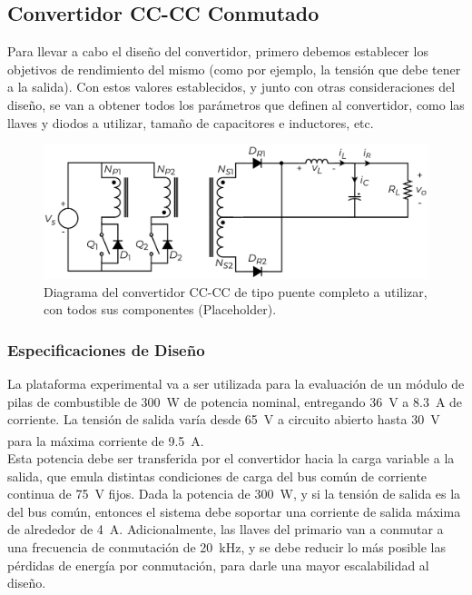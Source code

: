 \subsection{Convertidor CC-CC Conmutado}

Para llevar a cabo el diseño del convertidor, primero debemos establecer los objetivos de rendimiento del mismo (como por ejemplo, la tensión que debe tener a la salida). Con estos valores establecidos, y junto con otras consideraciones del diseño, se van a obtener todos los parámetros que definen al convertidor, como las llaves y diodos a utilizar, tamaño de capacitores e inductores, etc.\\

\begin{figure}[h]
    \centering
    \includegraphics[scale=0.6]{Imagenes/Push-Pull.pdf}
    \caption{Diagrama del convertidor CC-CC de tipo puente completo a utilizar, con todos sus componentes (Placeholder).}
    \label{puente_completo}
\end{figure}

\subsubsection{Especificaciones de Diseño}

La plataforma experimental va a ser utilizada para la evaluación de un módulo de pilas de combustible de \SI[]{300}[]{\watt} de potencia nominal, entregando \SI[]{36}[]{\volt} a \SI[]{8.3}[]{\ampere} de corriente. La tensión de salida varía desde \SI[]{65}[]{\volt} a circuito abierto hasta \SI[]{30}[]{\volt} para la máxima corriente de \SI[]{9.5}[]{\ampere}.\textsuperscript{\cite{HSeriesBrochure}}\\

Esta potencia debe ser transferida por el convertidor hacia la carga variable a la salida, que emula distintas condiciones de carga del bus común de corriente continua de \SI[]{75}[]{\volt} fijos. Dada la potencia de \SI[]{300}[]{\watt}, y si la tensión de salida es la del bus común, entonces el sistema debe soportar una corriente de salida máxima de alrededor de \SI[]{4}[]{\ampere}. Adicionalmente, las llaves del primario van a conmutar a una frecuencia de conmutación de \SI[]{20}[]{\kilo\hertz}, y se debe reducir lo más posible las pérdidas de energía por conmutación, para darle una mayor escalabilidad al diseño.

